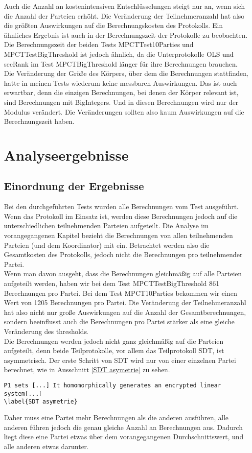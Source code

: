 Auch die Anzahl an kostenintensiven Entschlüsselungen steigt nur an, wenn sich die Anzahl der Parteien erhöht. Die Veränderung der Teilnehmeranzahl hat also die größten Auswirkungen auf die Berechnungskosten des Protokolls. Ein ähnliches Ergebnis ist auch in der Berechnungszeit der Protokolle zu beobachten.\\
Die Berechnungszeit der beiden Tests MPCTTest10Parties und MPCTTestBigThreshold ist jedoch ähnlich, da die Unterprotokolle OLS und secRank im Test MPCTBigThreshold länger für ihre Berechnungen brauchen.\\
Die Veränderung der Größe des Körpers, über dem die Berechnungen stattfinden, hatte 
in meinen Tests wiederum keine messbaren Auswirkungen. Das ist auch erwartbar, denn die einzigen Berechnungen, bei denen der Körper relevant ist, sind Berechnungen mit BigIntegers. Und in diesen Berechnungen wird nur der Modulus verändert. Die Veränderungen sollten also kaum Auswirkungen auf die Berechnungszeit haben.\\

\section{Analyseergebnisse}
\subsection{Einordnung der Ergebnisse}
Bei den durchgeführten Tests wurden alle Berechnungen vom Test ausgeführt. Wenn das Protokoll im Einsatz ist, werden diese Berechnungen jedoch auf die unterschiedlichen teilnehmenden Parteien aufgeteilt. Die Analyse im vorangegangenen Kapitel bezieht die Berechnungen von allen teilnehmenden Parteien (und dem Koordinator) mit ein. Betrachtet werden also die Gesamtkosten des Protokolls, jedoch nicht die Berechnungen pro teilnehmender Partei.\\
Wenn man davon ausgeht, dass die Berechnungen gleichmäßig auf alle Parteien aufgeteilt werden, haben wir bei dem Test MPCTTestBigThreshold 861 Berechnungen pro Partei. Bei dem Test MPCT10Parties bekommen wir einen Wert von 1205 Berechnungen pro Partei. Die Veränderung der Teilnehmeranzahl hat also nicht nur große Auswirkungen auf die Anzahl der Gesamtberechnungen, sondern beeinflusst auch die Berechnungen pro Partei stärker als eine gleiche Veränderung des thresholds.\\
Die Berechnungen werden jedoch nicht ganz gleichmäßig auf die Parteien aufgeteilt, denn beide Teilprotokolle, vor allem das Teilprotokoll SDT, ist asymmetrisch. Der erste Schritt von SDT wird nur von einer einzelnen Partei berechnet, wie in Ausschnitt \ref{SDT asymetrie} zu sehen. 
\begin{lstlisting}[caption = Ausschnitt des Teilprotokolls SDT \cite{Doettling2021}]
P1 sets [...] It homomorphically generates an encrypted linear system[...]
\label{SDT asymetrie}
\end{lstlisting}
Daher muss eine Partei mehr Berechnungen als die anderen ausführen, alle anderen führen jedoch die genau gleiche Anzahl an Berechnungen aus. Dadurch liegt diese eine Partei etwas über dem vorangegangenen Durchschnittswert, und alle anderen etwas darunter.

